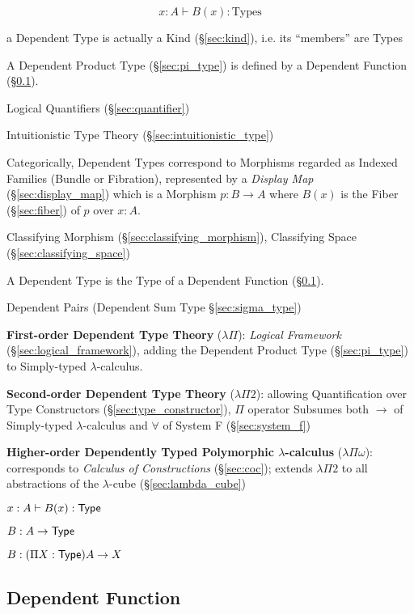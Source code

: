 \[
  x : A \vdash B(x):\mathrm{Types}
\]

a Dependent Type is actually a Kind (\S\ref{sec:kind}), i.e. its
``members'' are Types

A Dependent Product Type (\S\ref{sec:pi_type}) is defined by
a Dependent Function (\S\ref{sec:dependent_function}).

Logical Quantifiers (\S\ref{sec:quantifier})

Intuitionistic Type Theory (\S\ref{sec:intuitionistic_type})

Categorically, Dependent Types correspond to Morphisms regarded as
Indexed Families (Bundle or Fibration), represented by a \emph{Display
  Map} (\S\ref{sec:display_map}) which is a Morphism $p : B
\rightarrow A$ where $B(x)$ is the Fiber (\S\ref{sec:fiber}) of $p$
over $x:A$.

Classifying Morphism (\S\ref{sec:classifying_morphism}),
Classifying Space (\S\ref{sec:classifying_space})

A Dependent Type is the Type of a Dependent Function
(\S\ref{sec:dependent_function}).

Dependent Pairs (Dependent Sum Type \S\ref{sec:sigma_type})


\textbf{First-order Dependent Type Theory} ($\lambda \Pi$):
\emph{Logical Framework} (\S\ref{sec:logical_framework}), adding the
Dependent Product Type (\S\ref{sec:pi_type}) to Simply-typed
$\lambda$-calculus.


\textbf{Second-order Dependent Type Theory} ($\lambda \Pi 2$):
allowing Quantification over Type Constructors
(\S\ref{sec:type_constructor}), $\Pi$ operator Subsumes both
$\rightarrow$ of Simply-typed $\lambda$-calculus and $\forall$ of
System F (\S\ref{sec:system_f})


\textbf{Higher-order Dependently Typed Polymorphic $\lambda$-calculus}
($\lambda \Pi \omega$): corresponds to \emph{Calculus of
  Constructions} (\S\ref{sec:coc}); extends $\lambda \Pi 2$ to all
abstractions of the $\lambda$-cube (\S\ref{sec:lambda_cube})


\asterism


$x:A \vdash B(x):\mathsf{Type}$

$B : A \rightarrow \mathsf{Type}$

$B : (\Pi X:\mathsf{Type}) A \rightarrow X$



\subsection{Dependent Function}\label{sec:dependent_function}

